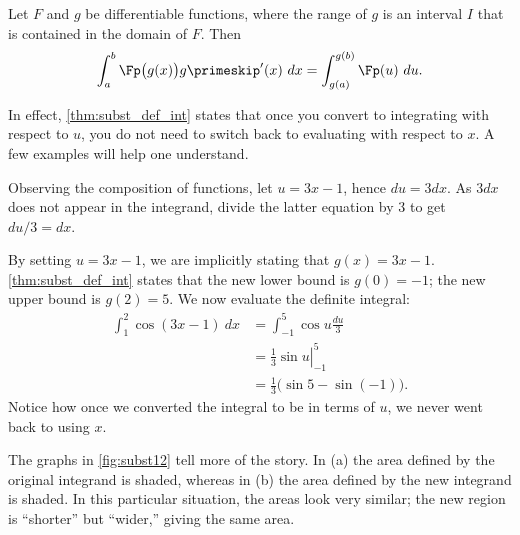 {Let $F$ and $g$ be differentiable functions, where the range of $g$ is an interval $I$ that is contained in the domain of $F$. Then 
$$\int_a^b \Fp\big(g(x)\big)g\primeskip'(x)\ dx = \int_{g(a)}^{g(b)} \Fp(u)\ du.$$
}

In effect, \autoref{thm:subst_def_int} states that once you convert to integrating with respect to $u$, you do not need to switch back to evaluating with respect to $x$. A few examples will help one understand.\\

{Observing the composition of functions, let $u=3x-1$, hence $du = 3dx$. As $3dx$ does not appear in the integrand, divide the latter equation by 3 to get $du/3 = dx$. 

By setting $u = 3x-1$, we are implicitly stating that $g(x) = 3x-1$. \autoref{thm:subst_def_int} states that the new lower bound is $g(0) = -1$; the new upper bound is $g(2) = 5$. We now evaluate the definite integral:
\clearpage
{}
\begin{align*}
	\int_1^2 \cos(3x-1) \ dx
	&= \int_{-1}^5 \cos u \frac{du}{3} \\
	&= \left.\frac{1}{3} \sin u\right|_{-1}^5 \\
	&= \frac{1}{3}\big(\sin 5- \sin (-1)\big).%
\end{align*}
Notice how once we converted the integral to be in terms of $u$, we never went back to using $x$.

The graphs in \autoref{fig:subst12} tell more of the story. In (a) the area defined by the original integrand is shaded, whereas in (b) the area defined by the new integrand is shaded. In this particular situation, the areas look very similar; the new region is ``shorter'' but ``wider,'' giving the same area.}

